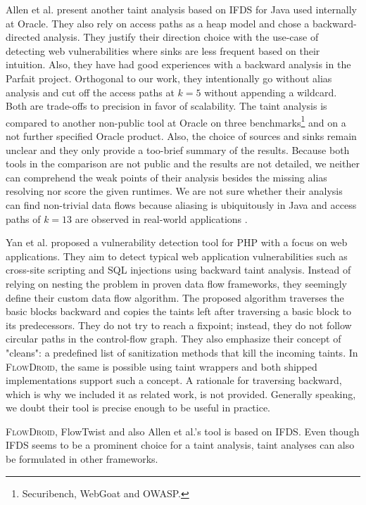 \documentclass[../draft.tex]{subfiles}
\begin{document}
    Allen et al.\cite{Allen2021} present another taint analysis based on IFDS for Java used internally at Oracle.
    They also rely on access paths as a heap model and chose a backward-directed analysis.
    They justify their direction choice with the use-case of detecting web vulnerabilities where sinks are less frequent based on their intuition.
    Also, they have had good experiences with a backward analysis in the Parfait\cite{Winter2013} project.
    Orthogonal to our work, they intentionally go without alias analysis and cut off the access paths at $k=5$ without appending a wildcard.
    Both are trade-offs to precision in favor of scalability.
    The taint analysis is compared to another non-public tool at Oracle on three benchmarks\footnote{Securibench, WebGoat and OWASP.} and on a not further specified Oracle product.
    Also, the choice of sources and sinks remain unclear and they only provide a too-brief summary of the results.
    Because both tools in the comparison are not public and the results are not detailed, we neither can comprehend the weak points of their analysis besides the missing alias resolving nor score the given runtimes.
    We are not sure whether their analysis can find non-trivial data flows because aliasing is ubiquitously in Java and access paths of $k=13$ are observed in real-world applications \cite{Spaeth2019}.

    Yan et al.\cite{Yan2017} proposed a vulnerability detection tool for PHP with a focus on web applications.
    They aim to detect typical web application vulnerabilities such as cross-site scripting and SQL injections using backward taint analysis.
    Instead of relying on nesting the problem in proven data flow frameworks, they seemingly define their custom data flow algorithm.
    The proposed algorithm traverses the basic blocks backward and copies the taints left after traversing a basic block to its predecessors.
    They do not try to reach a fixpoint; instead, they do not follow circular paths in the control-flow graph.
    They also emphasize their concept of "cleans": a predefined list of sanitization methods that kill the incoming taints.
    In \textsc{FlowDroid}, the same is possible using taint wrappers and both shipped implementations support such a concept.
    A rationale for traversing backward, which is why we included it as related work, is not provided.
    Generally speaking, we doubt their tool is precise enough to be useful in practice.

    \textsc{FlowDroid}, FlowTwist and also Allen et al.'s tool is based on IFDS.
    Even though IFDS seems to be a prominent choice for a taint analysis, taint analyses can also be formulated in other frameworks.
\end{document}
